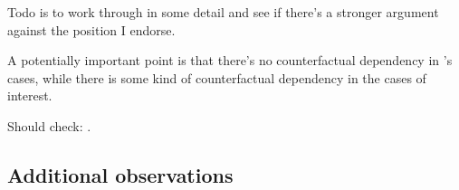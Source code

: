 \begin{note}
  Todo is to work through \citeauthor{Audi:1983ux} in some detail and see if there's a stronger argument against the position I endorse.

  A potentially important point is that there's no counterfactual dependency in \citeauthor{Lehrer:1971aa}'s cases, while there is some kind of counterfactual dependency in the cases of interest.

  Should check: \textcite{Tierney:2012tt}.
\end{note}


\subsection{Additional observations}
\label{sec:addit-observ}

